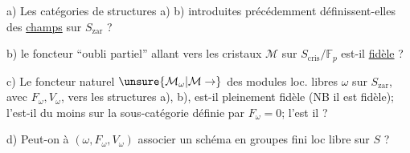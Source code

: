 a) Les catégories de structures a) b) introduites précédemment définissent-elles des \uline{champs} sur $S_{\mathrm{zar}}$ ?

b) le foncteur ``oubli partiel''  allant vers les cristaux $\mathcal M$ sur $S_{\mathrm{cris}}/\mathbb F_p$ est-il \uline{fidèle} ?

c) Le foncteur naturel $\unsure{\mathcal M_\omega|\mathcal M\to}$ des modules loc. libres $\omega$ sur $S_{\mathrm{zar}}$, avec $F_\omega,V_\omega$, vers les structures a), b), est-il pleinement fidèle (NB il est fidèle); l'est-il du moins   sur la sous-catégorie définie par $F_\omega=0$; l'est il  ?

d) Peut-on à $(\omega,F_\omega,V_\omega)$ associer un schéma en groupes fini loc libre sur $S$ ?
